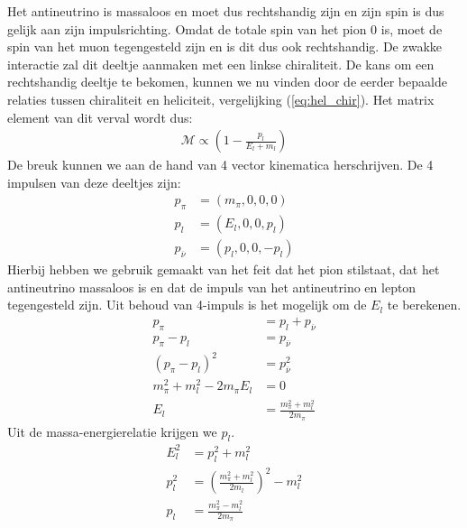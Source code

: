 \documentclass[../main.tex]{subfiles}
\begin{document}
Het antineutrino is massaloos en moet dus rechtshandig zijn en zijn spin is dus gelijk aan zijn impulsrichting. Omdat de totale spin van het pion 0 is, moet de spin van het muon tegengesteld zijn en is dit dus ook rechtshandig. De zwakke interactie zal dit deeltje aanmaken met een linkse chiraliteit. De kans om een rechtshandig deeltje te bekomen, kunnen we nu vinden door de eerder bepaalde relaties tussen chiraliteit en heliciteit, vergelijking (\ref{eq:hel_chir}). Het matrix element van dit verval wordt dus:
\begin{equation}
    \begin{aligned}
        \label{eq:pion_verval_matrix}
        \mathcal{M} \propto \left( 1 - \frac{p_l}{E_l + m_l} \right)
    \end{aligned}
\end{equation}
De breuk kunnen we aan de hand van 4 vector kinematica herschrijven. De 4 impulsen van deze deeltjes zijn:
\begin{equation}
    \begin{aligned}
        \label{eq:4_impuls_pion_verval}
        p_\pi &= (m_\pi,0,0,0)\\
        p_l &= (E_l, 0, 0, p_l)\\
        p_{\overline \nu} &= (p_l, 0, 0, -p_l)
    \end{aligned}
\end{equation}
Hierbij hebben we gebruik gemaakt van het feit dat het pion stilstaat, dat het antineutrino massaloos is en dat de impuls van het antineutrino en lepton tegengesteld zijn. Uit behoud van 4-impuls is het mogelijk om de $E_l$ te berekenen.
\begin{equation}
    \begin{aligned}
        \label{eq:berekenen_e_l}
        p_\pi &= p_l + p_{\overline \nu}\\
        p_\pi - p_l &= p_{\overline \nu}\\
        (p_\pi - p_l)^2 &= p_{\overline \nu}^2\\
        m_\pi^2+m_l^2-2m_\pi E_l &= 0\\
        E_l &= \frac{m_\pi^2 + m_l^2}{2m_\pi}
    \end{aligned}
\end{equation}
Uit de massa-energierelatie krijgen we $p_l$.
\begin{equation}
    \begin{aligned}
        \label{eq:berekenen_p_l}
        E_l^2 &= p_l^2 + m_l^2\\
        p_l^2 &= \left( \frac{m_\pi^2+m_l^2}{2m_l} \right)^2-m_l^2\\
        p_l &= \frac{m_\pi^2-m_l^2}{2m_\pi} 
    \end{aligned}
\end{equation}
\end{document}
